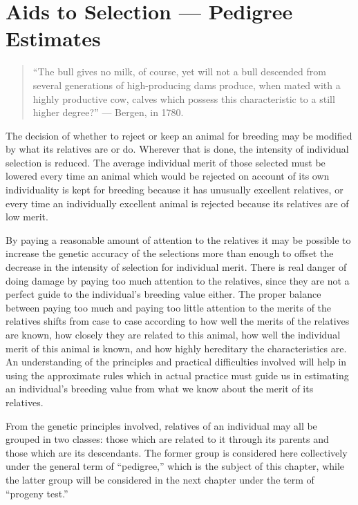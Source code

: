 \chapter{Aids to Selection --- Pedigree Estimates}
\label{cha:Lush_Chapter_14}

\begin{quote}
``The bull gives no milk, of course, yet will not a bull descended from several generations
of high-producing dams produce, when mated with a highly productive cow,
calves which possess this characteristic to a still higher degree?'' --- Bergen, in 1780.
\end{quote}

The decision of whether to reject or keep an animal for breeding
may be modified by what its relatives are or do. Wherever that is done,
the intensity of individual selection is reduced. The average individual
merit of those selected must be lowered every time an animal which
would be rejected on account of its own individuality is kept for breeding
because it has unusually excellent relatives, or every time an individually
excellent animal is rejected because its relatives are of low
merit.

By paying a reasonable amount of attention to the relatives it may
be possible to increase the genetic accuracy of the selections more than
enough to offset the decrease in the intensity of selection for individual
merit. There is real danger of doing damage by paying too much attention
to the relatives, since they are not a perfect guide to the individual's
breeding value either. The proper balance between paying too
much and paying too little attention to the merits of the relatives shifts
from case to case according to how well the merits of the relatives are
known, how closely they are related to this animal, how well the individual
merit of this animal is known, and how highly hereditary the
characteristics are. An understanding of the principles and practical
difficulties involved will help in using the approximate rules which in
actual practice must guide us in estimating an individual's breeding
value from what we know about the merit of its relatives.

From the genetic principles involved, relatives of an individual may
all be grouped in two classes: those which are related to it through its
parents and those which are its descendants. The former group is considered
here collectively under the general term of ``pedigree,'' which is
the subject of this chapter, while the latter group will be considered in
the next chapter under the term of ``progeny test.''

